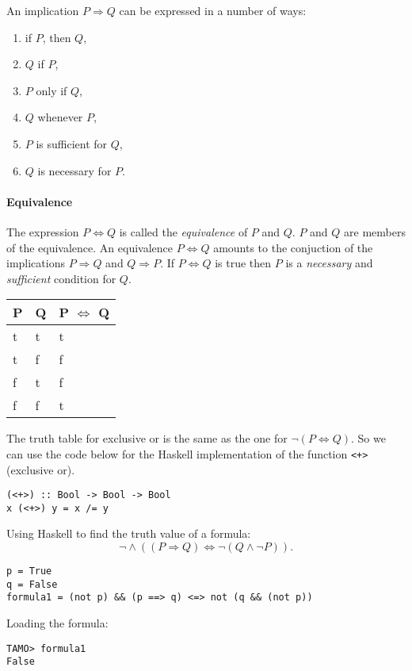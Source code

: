\documentclass[11pt]{article}
\begin{document}
An implication $P \Rightarrow Q$ can be expressed in a number of ways:
\begin{enumerate}
\item if $P$, then $Q$,
\item $Q$ if $P$,
\item $P$ only if $Q$,
\item $Q$ whenever $P$,
\item $P$ is sufficient for $Q$,
\item $Q$ is necessary for $P$.
\end{enumerate}

\paragraph{Equivalence}
The expression $P \iff Q$ is called the \textit{equivalence} of $P$ and $Q$. $P$ and $Q$ are members of the equivalence. An equivalence $P \iff Q$ amounts to the conjuction of the implications $P \Rightarrow Q$ and $Q \Rightarrow P$. If $P \iff Q$ is true then $P$ is a \textit{necessary} and \textit{sufficient} condition for $Q$.

\begin{tabular}{|l|l|l|}
\hline
	\textbf{P} & \textbf{Q} & \textbf{P} $\iff$ \textbf{Q}\\
\hline
	t & t & t\\
\hline
	t & f & f\\
\hline
	f & t & f\\
\hline
	f & f & t\\
\hline
\end{tabular}

The truth table for exclusive or is the same as the one for $\lnot (P \iff Q)$. So we can use the code below for the Haskell implementation of the function \texttt{<+>} (exclusive or).

\begin{verbatim}
(<+>) :: Bool -> Bool -> Bool
x (<+>) y = x /= y
\end{verbatim}

Using Haskell to find the truth value of a formula: 
$$\lnot \land ((P \Rightarrow Q) \iff \lnot (Q \land \lnot P)).$$

\begin{verbatim}
p = True
q = False
formula1 = (not p) && (p ==> q) <=> not (q && (not p))
\end{verbatim}

Loading the formula:
\begin{verbatim}
TAMO> formula1
False
\end{verbatim}
\end{document}
